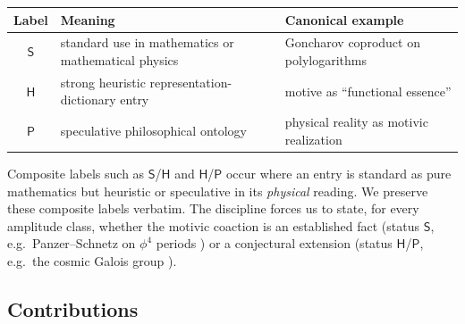 \documentclass[12pt]{article}
\theoremstyle{definition}
\theoremstyle{remark}
\newcommand{\Slab}{\ensuremath{\mathsf{S}}}
\newcommand{\Hlab}{\ensuremath{\mathsf{H}}}
\newcommand{\Plab}{\ensuremath{\mathsf{P}}}
\begin{document}
\begin{statusbox}
\begin{center}
\begin{tabular}{@{}c L{0.42\textwidth} L{0.40\textwidth}@{}}
\toprule
\textbf{Label} & \textbf{Meaning} & \textbf{Canonical example} \\
\midrule
\Slab{} & standard use in mathematics or mathematical physics & Goncharov coproduct on polylogarithms \\
\Hlab{} & strong heuristic representation-dictionary entry & motive as ``functional essence'' \\
\Plab{} & speculative philosophical ontology & physical reality as motivic realization \\
\bottomrule
\end{tabular}
\end{center}
\end{statusbox}

\noindent
Composite labels such as \Slab/\Hlab{} and \Hlab/\Plab{} occur where an entry is standard as
pure mathematics but heuristic or speculative in its \emph{physical} reading. We preserve
these composite labels verbatim. The discipline forces us to state, for every amplitude
class, whether the motivic coaction is an established fact (status \Slab, e.g.\ Panzer--Schnetz
on $\phi^4$ periods \cite{PanzerSchnetz}) or a conjectural extension (status \Hlab/\Plab,
e.g.\ the cosmic Galois group \cite{BrownCosmic}).

\subsection{Contributions}
\end{document}
